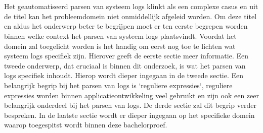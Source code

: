 
\chapter{}
\label{ch:inleiding}



Het geautomatiseerd parsen van systeem logs klinkt als een complexe casus en uit de titel kan het probleemdomein niet onmiddellijk afgeleid worden. Om deze titel en aldus het onderwerp beter te begrijpen moet er ten eerste begrepen worden binnen welke context het parsen van systeem logs plaatsvindt. Voordat het domein zal toegelicht worden is het handig om eerst nog toe te lichten wat systeem logs specifiek zijn. Hierover geeft de eerste sectie meer informatie. Een tweede onderwerp, dat cruciaal is binnen dit onderzoek, is wat het parsen van logs specifiek inhoudt. Hierop wordt dieper ingegaan in de tweede sectie. Een belangrijk begrip bij het parsen van logs is `reguliere expressies`, reguliere expressies worden binnen applicatieontwikkeling veel gebruikt en zijn ook een zeer belangrijk onderdeel bij het parsen van logs. De derde sectie zal dit begrip verder bespreken. In de laatste sectie wordt er dieper ingegaan op het specifieke domein waarop toegespitst wordt binnen deze bachelorproef. 

